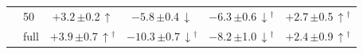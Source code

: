 \begin{table}[htbp]
\begin{tabular}{llcccc}
 & 50 & $+3.2$\,{\scriptsize$\pm$0.2}\,$\uparrow$ & $-5.8$\,{\scriptsize$\pm$0.4}\,$\downarrow$ & $-6.3$\,{\scriptsize$\pm$0.6}\,$\downarrow$$^\dagger$ & $+2.7$\,{\scriptsize$\pm$0.5}\,$\uparrow$$^\dagger$ \\
 & full & $+3.9$\,{\scriptsize$\pm$0.7}\,$\uparrow$$^\dagger$ & $-10.3$\,{\scriptsize$\pm$0.7}\,$\downarrow$$^\dagger$ & $-8.2$\,{\scriptsize$\pm$1.0}\,$\downarrow$$^\dagger$ & $+2.4$\,{\scriptsize$\pm$0.9}\,$\uparrow$$^\dagger$ \\
\bottomrule
\end{tabular}
\end{table}
